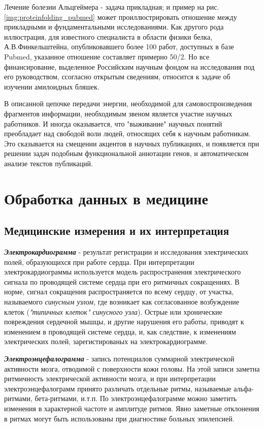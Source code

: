 Лечение болезни Альцгеймера - задача прикладная; и пример на рис. \ref{img:proteinfolding_pubmed} может проиллюстрировать отношение между прикладными и фундаментальными исследованиями. Как другого рода иллюстрация, для известного специалиста в области физики белка, А.В.Финкельштейна, опубликовавшего более 100 работ, доступных в базе Pubmed, указанное отношение составляет примерно 50/2. Но все финансирование, выделенное Российским научным фондом на исследования под его руководством, ссогласно открытым сведениям, относится к задаче об изучении амилоидных бляшек.

В описанной цепочке передачи энергии, необходимой для самовоспроизведения фрагментов информации, необходимым звеном является участие научных работников. И иногда оказывается, что "выживание" научных понятий преобладает над свободой воли людей, относящих себя к научным работникам. Это сказывается на смещении акцентов в научных публикациях, и появляется при решении задач подобным функциональной аннотации генов, и автоматическом анализе текстов публикаций.


\section{Обработка данных в медицине}

\subsection{Медицинские измерения и их интерпретация}

\noindent
\textbf{ \textit{Электрокардиограмма} } - результат регистрации и исследования электрических полей, образующихся при работе сердца. При интерпретации электрокардиограммы используется модель распространения электрического сигнала по проводящей системе сердца при его ритмичных сокращениях. В норме, сигнал сокращения распространяется по всему сердцу, от участка, называемого \textit{синусным узлом}, где возникает как согласованное возбуждение клеток (\textit{"типичных клеток" синусного узла}). Острые или хронические повреждения сердечной мышцы, и другие нарушения его работы, приводят к изменением в проводящей системе сердца, и, как следствие, к изменениям электрических полей, зарегистированых на электрокардиограмме.

\noindent
\textbf{ \textit{Электроэнцефалограмма} } - запись потенциалов суммарной электрической активности мозга, отводимой с поверхности кожи головы. На этой записи заметна ритмичность электрической активности мозга, и при интерпретации электроэнцефалограмм принято различать отдельные ритмы, называемые альфа-ритмами, бета-ритмами, и.т.п. По электроэнцефалограмме можно заметить изменения в  характерной частоте и амплитуде ритмов. Явно заметные отклонения в ритмах могут быть использованы при диагностике больных эпилепсией.

